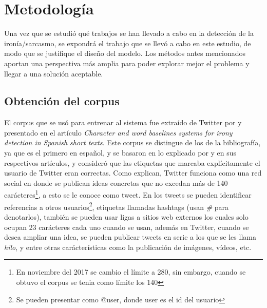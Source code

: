 \chapter{Metodología}\label{cap.metodologia}

\par Una vez que se estudió qué trabajos se han llevado a cabo en la detección de la ironía/sarcasmo, se expondrá el trabajo que se llevó a cabo en este estudio, de modo que se justifique el diseño del modelo. Los métodos antes mencionados aportan una perspectiva más amplia para poder explorar mejor el problema y llegar a una solución aceptable.
\section{Obtención del corpus}
\par El corpus que se usó para entrenar al sistema fue extraído de Twitter por \textcite{lopez2016character} y presentado en el artículo \textit{Character and word baselines systems for irony detection in Spanish short texts}. Este corpus se distingue de los de la bibliografía, ya que es el primero en español, y se basaron en lo explicado por \textcite{reyes2012making} y \textcite{liebrecht2013perfect} en sus respectivos artículos, y consideró que las etiquetas que marcaba explícitamente el usuario de Twitter eran correctas. Como \textcite{lopez2016character} explican, Twitter funciona como una red social en donde se publican ideas concretas que no excedan más de 140 carácteres\footnote[1]{En noviembre del 2017 se cambio el límite a 280, sin embargo, cuando se obtuvo el corpus se tenia como límite los 140}, a esto se le conoce como tweet. En los tweets se pueden identificar referencias a otros usuarios\footnote{Se pueden presentar como @user, donde user es el id del usuario}, etiquetas llamadas hashtags (usan \textit{\#} para denotarlos), también se pueden usar ligas a sitios web externos los cuales solo ocupan 23 carácteres cada uno cuando se usan, además en Twitter, cuando se desea ampliar una idea, se pueden publicar tweets en serie a los que se les llama \textit{hilo}, y entre otras carácterísticas como la publicación de imágenes, vídeos, etc.


